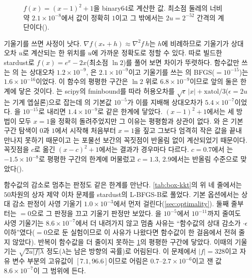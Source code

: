 \begin{figure}[htbp]
\centering
{}
\caption{$f(x)=(x-1)^2+1$을 binary64로 계산한 값. 최소점 둘레의 너비 약 $2.1\times10^{-8}$에서 값이 정확히 $1$이고 그 밖에서는 $2u=2^{-52}$ 간격의 계단이다().}
\label{fig:flat}
\end{figure}

기울기를 쓰면 사정이 낫다. $\nabla f(x_\ast+h)\approx\nabla^2f\,h$는 $h$에 비례하므로 기울기가 상대오차 $u$로 계산되는 한 위치를 $u$에 가까운 정확도로 정할 수 있다. 따로 빌드한 stardust로 $f(x)=e^x-2x$(최소점 $\ln2$)를 풀어 보면 차이가 뚜렷하다. 함수값만 쓰는 의 는 상대오차 $1.2\times10^{-9}$, 은 $2.1\times10^{-9}$이고 기울기를 쓰는 의 BFGS($=10^{-15}$)는 $1.6\times10^{-16}$이었다. 이 함수의 평평한 구간은 $\ln2$ 위로 $6.8\times10^{-9}$이므로 앞의 둘은 한계에 닿은 것이다. 는 scipy의 fminbound를 따라 허용오차를 $\sqrt{\epsilon}\,|x|+\mathrm{xatol}/3$($\epsilon=2u$는 기계 엡실론)으로 잡는데 의 기본값 $10^{-5}$가 이를 지배해 상대오차가 $5.4\times10^{-7}$이었다. 을 $10^{-15}$로 내리면 $1.4\times10^{-9}$로 같은 한계에 닿았다. $(x-1)^2+1$에서는 세 방법이 모두 $x=1$을 정확히 돌려주었지만 그 이유는 평평함과 상관이 없다. 와 은 기본 구간 탐색이 $0$과 $1$에서 시작해 처음부터 $x=1$을 짚고 그보다 엄격히 작은 값을 끝내 만나지 못하기 때문이고 는 포물선 보간의 꼭짓점이 반올림 없이 계산되었기 때문이다. 꼭짓점을 $c$로 옮긴 $(x-c)^2+1$에서는 결과가 경우마다 다르다. $c=0.7$에서 는 $-1.5\times10^{-8}$로 평평한 구간의 한계에 머물렀고 $c=1.3$, $2.9$에서는 반올림 수준으로 맞았다().

함수값의 감소로 멈추는 판정도 같은 한계를 만난다. \cref{tab:box-kkt}의 위 네 줄에서는 $50$차원의 상자 제약 이차 문제를 stardust의 L-BFGS-B로 풀었다. 기본 옵션에서는 상대 감소 판정이 사영 기울기 $1.0\times10^{-3}$에서 먼저 걸린다(\cref{sec:optimality}). 둘째 줄부터는 $=0$으로 그 판정을 끄고 기울기 판정만 보았다. 을 $10^{-5}$에서 $10^{-11}$까지 줄여도 사영 기울기는 $8.6\times10^{-7}$에서 더 내려가지 않고 멈춤 사유는 ``함수값의 상대 감소가 $\cdot\epsilon$ 이하''였다($=0$으로 둔 실험이므로 이 사유가 나왔다면 함수값이 한 걸음에서 전혀 줄지 않았다). 반복이 함수값을 더 줄이지 못하는 \cref{fig:flat}의 평평한 구간에 닿았다. 이때의 기울기는 $\sqrt{2u|f|\lambda}$ 정도($\lambda$는 남은 방향의 곡률)로 어림된다. 이 문제에서 $|f|=328$이고 자유 변수 부분의 고유값이 $[7.1,96.6]$이므로 어림은 $0.7$--$2.7\times10^{-6}$이고 잰 값 $8.6\times10^{-7}$이 그 범위에 든다.

